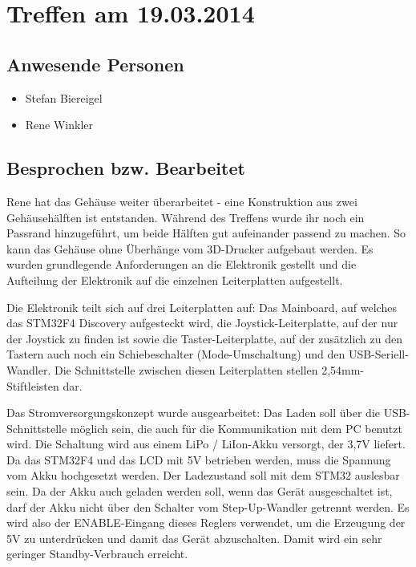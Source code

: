 \chapter{Treffen am 19.03.2014}
\section{Anwesende Personen}
\begin{itemize}
	\item Stefan Biereigel
	\item Rene Winkler
\end{itemize}

\section{Besprochen bzw. Bearbeitet}
Rene hat das Gehäuse weiter überarbeitet - eine Konstruktion aus zwei Gehäusehälften ist entstanden. Während des Treffens wurde ihr noch ein Passrand hinzugeführt, um beide Hälften gut aufeinander passend zu machen. So kann das Gehäuse ohne Überhänge vom 3D-Drucker aufgebaut werden. Es wurden grundlegende Anforderungen an die Elektronik gestellt und die Aufteilung der Elektronik auf die einzelnen Leiterplatten aufgestellt.

Die Elektronik teilt sich auf drei Leiterplatten auf: Das Mainboard, auf welches das STM32F4 Discovery aufgesteckt wird, die Joystick-Leiterplatte, auf der nur der Joystick zu finden ist sowie die Taster-Leiterplatte, auf der zusätzlich zu den Tastern auch noch ein Schiebeschalter (Mode-Umschaltung) und den USB-Seriell-Wandler.
Die Schnittstelle zwischen diesen Leiterplatten stellen 2,54mm-Stiftleisten dar.

Das Stromversorgungskonzept wurde ausgearbeitet: Das Laden soll über die USB-Schnittstelle möglich sein, die auch für die Kommunikation mit dem PC benutzt wird. Die Schaltung wird aus einem LiPo / LiIon-Akku versorgt, der 3,7V liefert. Da das STM32F4 und das LCD mit 5V betrieben werden, muss die Spannung vom Akku hochgesetzt werden. Der Ladezustand soll mit dem STM32 auslesbar sein. Da der Akku auch geladen werden soll, wenn das Gerät ausgeschaltet ist, darf der Akku nicht über den Schalter vom Step-Up-Wandler getrennt werden. Es wird also der ENABLE-Eingang dieses Reglers verwendet, um die Erzeugung der 5V zu unterdrücken und damit das Gerät abzuschalten. Damit wird ein sehr geringer Standby-Verbrauch erreicht.
